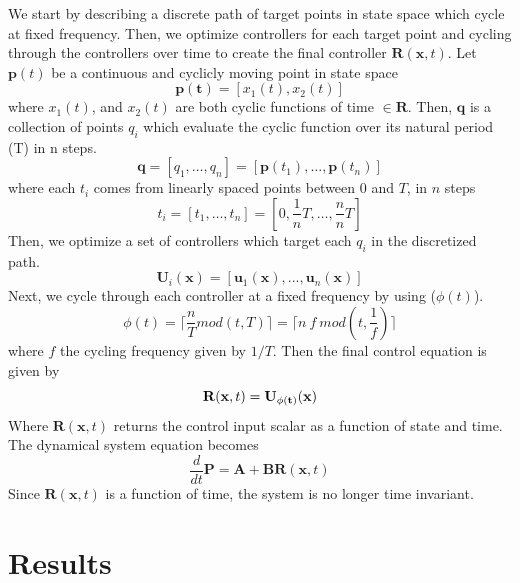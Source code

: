 \documentclass[12pt]{iopart}
\begin{document}
 We start by describing a discrete path  of target points in state space which cycle at fixed frequency.
  Then, we optimize controllers for each target point and cycling through the controllers over time to create the final controller $\mathbf{R}(\mathbf{x},t)$.
Let $\mathbf{p}(t)$ be a continuous and cyclicly moving point in state space
\begin{equation}
\mathbf{p(t)}=[x_1(t),x_2(t)]
\end{equation}
where $x_1(t)$, and $x_2(t)$ are both cyclic functions of time $\in \mathbf{R}$.
Then, $\mathbf{q}$ is a collection of points $q_i$ which evaluate the cyclic function over its natural period (T) in n steps. 
\begin{equation}
\mathbf{q}=[q_1,\ldots ,q_n]=[\mathbf{p}(t_1),\ldots,\mathbf{p}(t_n)]
\end{equation}
where each $t_i$ comes from linearly spaced points between $0$ and $T$, in $n$ steps 
\begin{equation}
t_i = [t_1,\ldots,t_n]=[0,\frac{1}{n} T,\ldots,\frac{n}{n}T]
\end{equation}
Then, we optimize a set of controllers which target each $q_i$ in the discretized path.
\begin{equation}
\mathbf{U}_i(\mathbf{x})=[\mathbf{u}_1(\mathbf{x}),...,\mathbf{u}_n(\mathbf{x})]
\end{equation}
Next, we cycle through each controller at a fixed frequency by using ($\phi(t)$). 
\begin{equation}
\phi(t)=\lceil \frac{n}{T} mod(t,T)\rceil = \lceil n \ f \ mod(t,\frac{1}{f})\rceil
\end{equation}
where $f$ the cycling frequency given by $1/T$. Then the final control equation is given by 
 \begin{equation}
\mathbf{R}(\mathbf{x},t)=\bf{U}_{\phi(t)}(x)
\end{equation}
Where $\mathbf{R}(\mathbf{x},t)$ returns the control input scalar as a function of state and time. 
The dynamical system equation becomes
\begin{equation}
\frac{d}{dt}\mathbf{P}=\mathbf{A}+\mathbf{B}\mathbf{R}(\mathbf{x},t)
\end{equation}
Since $\mathbf{R}(\mathbf{x},t)$ is a function of time, the system is no longer time invariant. 
\section{Results}

\end{document}

